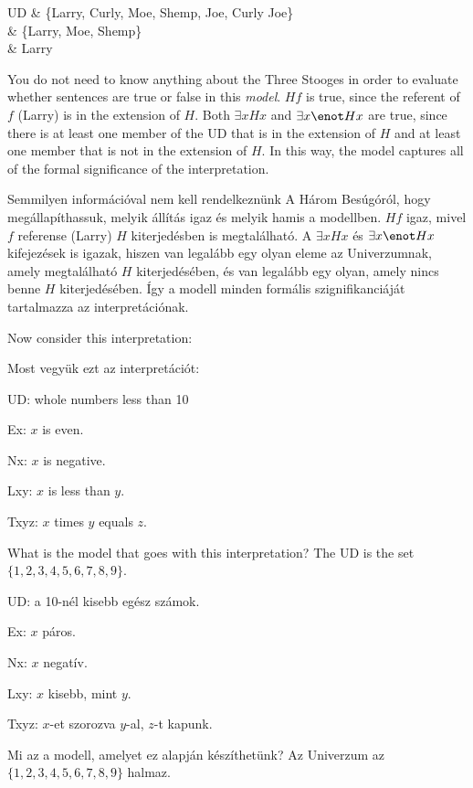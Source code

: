 \begin{partialmodel}
	UD & \{Larry, Curly, Moe, Shemp, Joe, Curly Joe\}\\
	 & \{Larry, Moe, Shemp\}\\
	 & Larry
\end{partialmodel}

You do not need to know anything about the Three Stooges in order to evaluate whether sentences are true or false in this \emph{model}. $Hf$ is true, since the referent of $f$ (Larry) is in the extension of $H$. Both $\exists x Hx$ and $\exists x \enot Hx$ are true, since there is at least one member of the UD that is in the extension of $H$ and at least one member that is not in the extension of $H$. In this way, the model captures all of the formal significance of the interpretation.

Semmilyen információval nem kell rendelkeznünk A Három Besúgóról, hogy megállapíthassuk, melyik állítás igaz és melyik hamis a modellben. $Hf$ igaz, mivel $f$ referense (Larry) $H$ kiterjedésben is megtalálható. A $\exists x Hx$ és $\exists x \enot Hx$ kifejezések is igazak, hiszen van legalább egy olyan eleme az Univerzumnak, amely megtalálható $H$ kiterjedésében, és van legalább egy olyan, amely nincs benne $H$ kiterjedésében. Így a modell minden formális szignifikanciáját tartalmazza az interpretációnak.

Now consider this interpretation:

Most vegyük ezt az interpretációt:

\begin{ekey}
\item{UD:} whole numbers less than 10
\item{Ex:} $x$ is even.
\item{Nx:} $x$ is negative.
\item{Lxy:} $x$ is less than $y$.
\item{Txyz:} $x$ times $y$ equals $z$.
\end{ekey}
What is the model that goes with this interpretation?
The UD is the set $\{1,2,3,4,5,6,7,8,9\}$.

\begin{ekey}
\item{UD:} a 10-nél kisebb egész számok.
\item{Ex:} $x$ páros.
\item{Nx:} $x$ negatív.
\item{Lxy:} $x$ kisebb, mint $y$.
\item{Txyz:} $x$-et szorozva $y$-al, $z$-t kapunk.
\end{ekey}
Mi az a modell, amelyet ez alapján készíthetünk?
Az Univerzum az $\{1,2,3,4,5,6,7,8,9\}$ halmaz.


